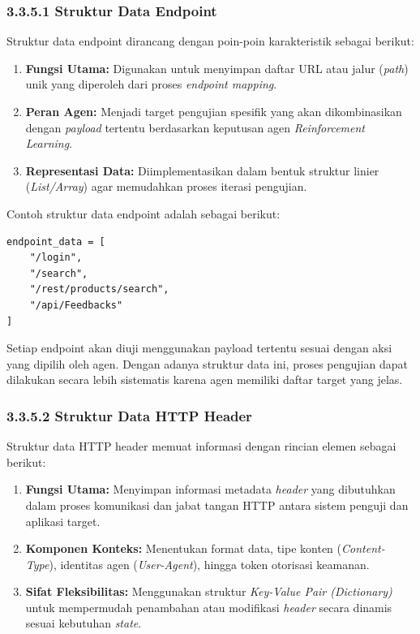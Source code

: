\subsubsection{3.3.5.1 Struktur Data Endpoint}

Struktur data endpoint dirancang dengan poin-poin karakteristik sebagai berikut:

\begin{enumerate}
    \item \textbf{Fungsi Utama:} Digunakan untuk menyimpan daftar URL atau jalur (\textit{path}) unik yang diperoleh dari proses \textit{endpoint mapping}.
    \item \textbf{Peran Agen:} Menjadi target pengujian spesifik yang akan dikombinasikan dengan \textit{payload} tertentu berdasarkan keputusan agen \textit{Reinforcement Learning}.
    \item \textbf{Representasi Data:} Diimplementasikan dalam bentuk struktur linier (\textit{List/Array}) agar memudahkan proses iterasi pengujian.
\end{enumerate}

Contoh struktur data endpoint adalah sebagai berikut:

\begin{verbatim}
endpoint_data = [
    "/login",
    "/search",
    "/rest/products/search",
    "/api/Feedbacks"
]
\end{verbatim}

Setiap endpoint akan diuji menggunakan payload tertentu sesuai dengan aksi yang dipilih oleh agen. Dengan adanya struktur data ini, proses pengujian dapat dilakukan secara lebih sistematis karena agen memiliki daftar target yang jelas.

\subsubsection{3.3.5.2 Struktur Data HTTP Header}

Struktur data HTTP header memuat informasi dengan rincian elemen sebagai berikut:

\begin{enumerate}
    \item \textbf{Fungsi Utama:} Menyimpan informasi metadata \textit{header} yang dibutuhkan dalam proses komunikasi dan jabat tangan HTTP antara sistem penguji dan aplikasi target.
    \item \textbf{Komponen Konteks:} Menentukan format data, tipe konten (\textit{Content-Type}), identitas agen (\textit{User-Agent}), hingga token otorisasi keamanan.
    \item \textbf{Sifat Fleksibilitas:} Menggunakan struktur \textit{Key-Value Pair (Dictionary)} untuk mempermudah penambahan atau modifikasi \textit{header} secara dinamis sesuai kebutuhan \textit{state}.
\end{enumerate}

